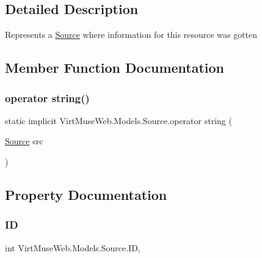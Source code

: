 \subsection{Detailed Description}
Represents a \mbox{\hyperlink{class_virt_muse_web_1_1_models_1_1_source}{Source}} where information for this resource was gotten 



\subsection{Member Function Documentation}
\mbox{\label{class_virt_muse_web_1_1_models_1_1_source_acd933e8a81cff0d4a66f271da6a7995d}} 
\subsubsection{\texorpdfstring{operator string()}{operator string()}}
{\footnotesize\ttfamily static implicit Virt\+Muse\+Web.\+Models.\+Source.\+operator string (\begin{DoxyParamCaption}\item[{\mbox{\hyperlink{class_virt_muse_web_1_1_models_1_1_source}{Source}}}]{src }\end{DoxyParamCaption})\hspace{0.3cm}{\ttfamily [static]}}



\subsection{Property Documentation}
\mbox{\label{class_virt_muse_web_1_1_models_1_1_source_a10ca9b78cbda18e52858594f92919d19}} 
\subsubsection{\texorpdfstring{ID}{ID}}
{\footnotesize\ttfamily int Virt\+Muse\+Web.\+Models.\+Source.\+ID\hspace{0.3cm}{\ttfamily [get]}, {\ttfamily [set]}}

